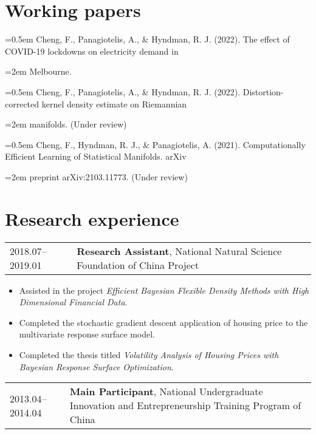 \documentclass[10pt,a4paper,]{article}
\providecommand{\tightlist}{%
  \setlength{\itemsep}{0pt}\setlength{\parskip}{0pt}}
\begin{document}
\section{Working papers}\label{working-papers-1}

\hangindent=0.5em Cheng, F., Panagiotelis, A., \& Hyndman,
R. J. (2022). The effect of COVID-19 lockdowns on electricity demand in

\hangindent=2em Melbourne.

\hangindent=0.5em Cheng, F., Panagiotelis, A., \& Hyndman,
R. J. (2022). Distortion-corrected kernel density estimate on Riemannian

\hangindent=2em manifolds. (Under review)

\hangindent=0.5em Cheng, F., Hyndman, R. J., \&
Panagiotelis, A. (2021). Computationally Efficient Learning of
Statistical Manifolds. arXiv

\hangindent=2em preprint arXiv:2103.11773. (Under review)

\section{Research experience}\label{research-experience-1}

\begin{tabular}{ll}
  2018.07--2019.01 & \textbf{Research Assistant}, National Natural Science Foundation of China Project \\ 
  \end{tabular}

\begin{itemize}
\tightlist
\item
  Assisted in the project \emph{Efficient Bayesian Flexible Density
  Methods with High Dimensional Financial Data}.
\item
  Completed the stochastic gradient descent application of housing price
  to the multivariate response surface model.
\item
  Completed the thesis titled \emph{Volatility Analysis of Housing
  Prices with Bayesian Response Surface Optimization}.
\end{itemize}

\begin{tabular}{ll}
  2013.04--2014.04 & \textbf{Main Participant}, National Undergraduate Innovation and Entrepreneurship Training Program of China \\ 
  \end{tabular}
\end{document}
